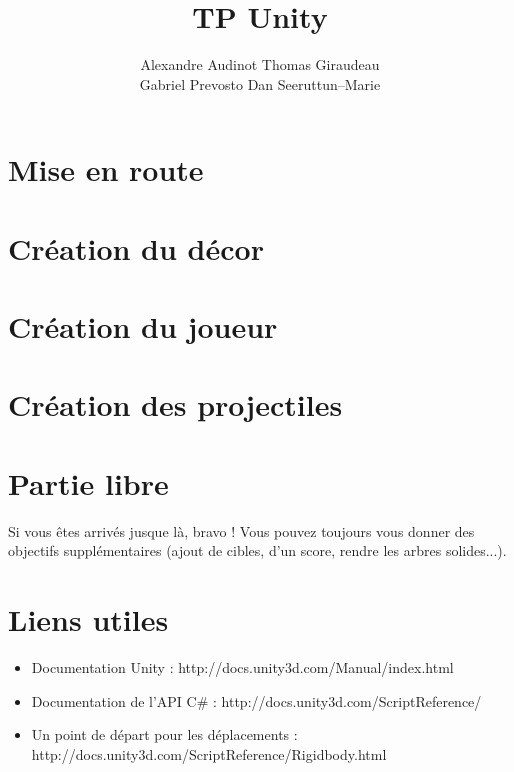\documentclass[a4paper]{article}
\title{TP Unity}
\author{Alexandre Audinot Thomas Giraudeau \\
Gabriel Prevosto Dan Seeruttun--Marie}
\begin{document}
\maketitle

\section{Mise en route} 
\section{Création du décor} 
\section{Création du joueur} 
\section{Création des projectiles} 
\section{Partie libre}
Si vous êtes arrivés jusque là, bravo ! Vous pouvez toujours vous donner des objectifs supplémentaires (ajout de cibles, d'un score, rendre les arbres solides...).
\section{Liens utiles}
\begin{itemize}
\item Documentation Unity : http://docs.unity3d.com/Manual/index.html
\item Documentation de l'API C\# : http://docs.unity3d.com/ScriptReference/
\item Un point de départ pour les déplacements : http://docs.unity3d.com/ScriptReference/Rigidbody.html
\end{itemize}
\end{document}
